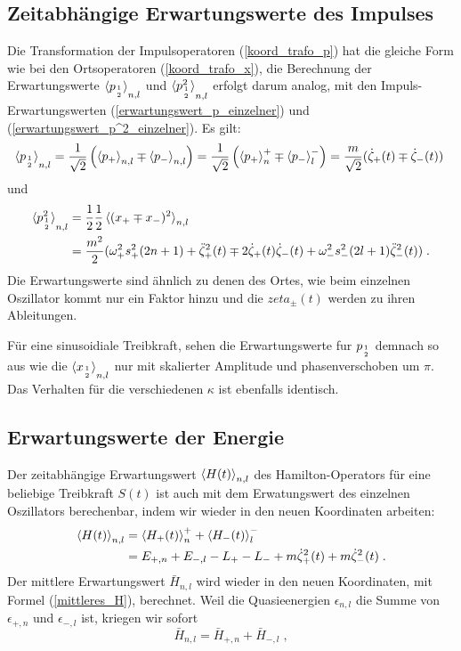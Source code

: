   \subsection{Zeitabhängige Erwartungswerte des Impulses}
    Die Transformation der Impulsoperatoren (\ref{koord_trafo_p}) hat die gleiche Form wie bei den Ortsoperatoren (\ref{koord_trafo_x}), die Berechnung der Erwartungswerte $\braket{p_{1 \atop 2}}_{n,l}$ und $\braket{p_{1\atop 2}^2}_{n,l}$ erfolgt darum analog, mit den Impuls-Erwartungswerten (\ref{erwartungswert_p_einzelner}) und (\ref{erwartungswert_p^2_einzelner}).
    Es gilt:
    \begin{align}
      \braket{p_{1 \atop 2}}_{n,l}=\frac{1}{\sqrt{2}}\left(\braket{p_+}_{n,l}\mp\braket{p_-}_{n,l}\right)
      =\frac{1}{\sqrt{2}}\left(\braket{p_+}_n^+\mp\braket{p_-}_l^-\right)
      =\frac{m}{\sqrt{2}}(\dot\zeta_+(t)\mp\dot\zeta_-(t)) \;
    \end{align}
    und
    \begin{align}
      \braket{p^2_{1\atop 2}}_{n,l}&=\frac{1}{2}\frac{1}{2}\braket{(x_+\mp x_-)^2}_{n,l} \notag\\
      &=\frac {m^2} 2 (\omega_+^2s_+^2(2n+1)+\ddot\zeta_+^2(t) \mp 2\dot\zeta_+(t)\dot\zeta_-(t) + \omega_-^2s_-^2(2l+1)\ddot\zeta_-^2(t)) \; .
    \end{align}
    Die Erwartungswerte sind ähnlich zu denen des Ortes, wie beim einzelnen Oszillator kommt nur ein Faktor hinzu und die $zeta_\pm(t)$ werden zu ihren Ableitungen.

    Für eine sinusoidiale Treibkraft, sehen die Erwartungswerte fur $p_{1\atop 2}$ demnach so aus wie die $\braket{x_{1\atop 2}}_{n,l}$ nur mit skalierter Amplitude und phasenverschoben um $\pi$.
    Das Verhalten für die verschiedenen $\kappa$ ist ebenfalls identisch.

  \subsection{Erwartungswerte der Energie}
    Der zeitabhängige Erwartungswert $\braket{H(t)}_{n,l}$ des Hamilton-Operators für eine beliebige Treibkraft $S(t)$ ist auch mit dem Erwatungswert des einzelnen Oszillators berechenbar, indem wir wieder in den neuen Koordinaten arbeiten:
    \begin{align}
      \braket{H(t)}_{n,l} &= \braket{H_+(t)}_n^+ + \braket{H_-(t)}_l^- \notag\\
      &= E_{+,n}+E_{-,l} -L_+-L_- +m\dot\zeta_+^2(t)+m\dot\zeta_-^2(t) \; .
    \end{align}
    Der mittlere Erwartungswert $\bar H_{n,l}$ wird wieder in den neuen Koordinaten, mit Formel (\ref{mittleres_H}), berechnet.
    Weil die Quasieenergien $\epsilon_{n,l}$ die Summe von $\epsilon_{+,n}$ und $\epsilon_{-,l}$ ist, kriegen wir sofort
    \begin{equation}
      \bar H_{n,l}=\bar H_{+,n}+\bar H_{-,l} \; ,
    \end{equation}

